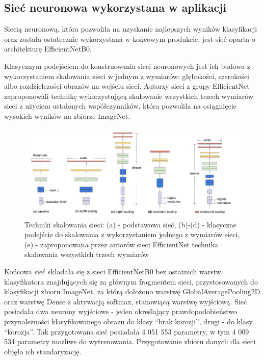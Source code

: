 \documentclass[polish,12pt]{aghthesis}
\begin{document}
\subsection{Sieć neuronowa wykorzystana w aplikacji}
\par Siecią neuronową, która pozwoliła na uzyskanie najlepszych wyników klasyfikacji oraz została ostatecznie wykorzystana w końcowym produkcie, jest sieć oparta o architekturę EfficientNetB0.
\par Klasycznym podejściem do konstruowania sieci neuronowych jest ich budowa z wykorzystaniem skalowania sieci w jednym z wymiarów: głębokości, szerokości albo rozdzielczości obrazów na wejściu sieci. Autorzy sieci z grupy EfficientNet zaproponowali technikę wykorzystującą skalowanie wszystkich trzech wymiarów sieci z użyciem ustalonych współczynników, która pozwoliła na osiągnięcie wysokich wyników na zbiorze ImageNet.
\begin{figure}[h!]
\centering
\includegraphics[width=16cm]{images/efficientNetScaling.png}
\caption{Techniki skalowania sieci: (a) - podstawowa sieć, (b)-(d) - klasyczne podejście do skalowania z wykorzystaniem jednego z wymiarów sieci, (e) - zaproponowana przez autorów sieci EfficientNet technika skalowania wszystkich trzech wymiarów\cite{artEffNet}}
\end{figure}

\par Końcowa sieć składała się z sieci EfficientNetB0 bez ostatnich warstw klasyfikatora znajdujących się za głównym fragmentem sieci, przystosowanych do klasyfikacji zbioru ImageNet, za którą dołożono warstwę GlobalAveragePooling2D oraz warstwę Dense z aktywacją softmax, stanowiącą warstwę wyjściową. Sieć posiadała dwa neurony wyjściowe - jeden określający prawdopodobieństwo przynależności klasyfikowanego obrazu do klasy ``brak korozji'', drugi - do klasy ``korozja''. Tak przygotowana sieć posiadała 4 051 553 parametry, w tym 4 009 534 parametry możliwe do wytrenowania. Przygotowanie zbioru danych dla sieci objęło ich standaryzację.
\end{document}
